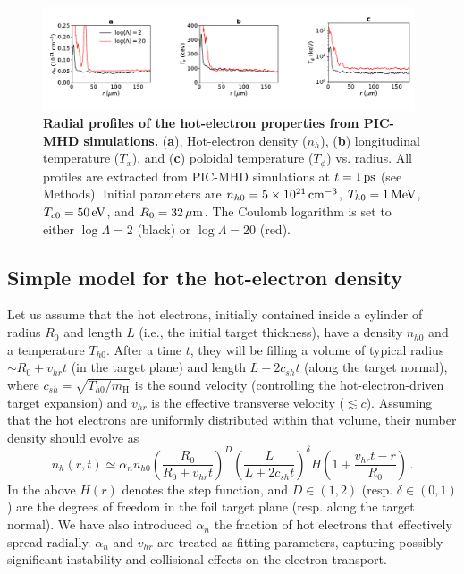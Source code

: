 \documentclass[aps,superscriptaddress]{revtex4}
\begin{document}
\begin{figure}[!t]
\centerline{
\includegraphics[width=0.98\textwidth]{FigS6.pdf} }
\caption{\label{fig:nt}
{\bf Radial profiles of the hot-electron properties from PIC-MHD simulations.}
({\bf a}), Hot-electron density ($n_h$), ({\bf b}) longitudinal temperature ($T_x$), and ({\bf c}) poloidal temperature ($T_\phi$) vs. radius.
All profiles are extracted from PIC-MHD simulations at $t=1\,\rm ps$ (see Methods). Initial parameters are $n_{h0}=5\times 10^{21}\,\rm cm ^{-3}$, $T_{h0} = 1\,\rm MeV$, $T_{c0}=50\,\rm eV$, and $R_0 = 32\,\mu\rm m$. The Coulomb logarithm is set to either $\log \Lambda=2$ (black) or $\log \Lambda=20$ (red).
}
\end{figure}

\subsection{Simple model for the hot-electron density}\label{subsec:nh}

Let us assume that the hot electrons, initially contained inside a cylinder of radius $R_0$ and length $L$ (i.e., the initial target thickness), have a density $n_{h0}$ and a temperature $T_{h0}$.
After a time $t$, they will be filling a volume of typical radius $\sim R_0 + v_{hr}t$ (in the target plane) and length $L+2c_{sh}t$ (along the target normal), where $c_{sh}=\sqrt{T_{h0}/m_\mathrm{H}}$ is the sound velocity (controlling the hot-electron-driven target expansion) and $v_{hr}$ is the effective transverse velocity ($\lesssim c$). Assuming that the hot electrons are uniformly distributed within that volume, their number density should evolve as
\begin{equation} \label{eq:nht}
n_h(r,t) \simeq \alpha_n n_{h0} \left( \frac{R_0}{R_0 + v_{hr}t } \right)^D \left( \frac{L}{L + 2c_{sh}t } \right)^\delta  H \left( 1 + \frac{v_{hr}t-r}{R_0} \right) \,.
\end{equation} 
In the above $H(r)$ denotes the step function, and $D \in (1,2)$ (resp. $\delta \in (0,1)$) are the degrees of freedom in the foil target plane (resp. along the target normal). We have also introduced $\alpha_n$ the fraction of hot electrons that effectively spread radially. $\alpha_n$ and $v_{hr}$ are treated as fitting parameters, capturing possibly significant instability and collisional effects on the electron transport.
\end{document}
